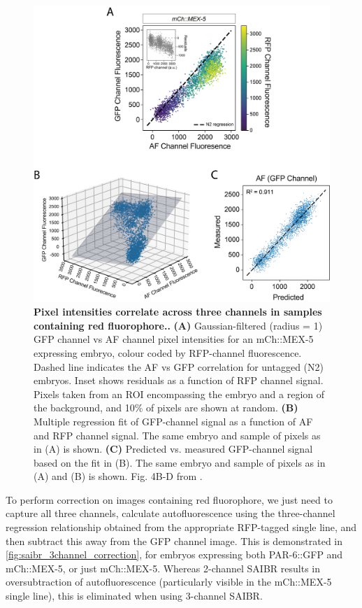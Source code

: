 \documentclass[12pt]{"article"}
\newcommand{\mycaption}[2]{\caption[#1]{\textbf{#1.} #2}}
\begin{document}
\begin{figure}
\includegraphics[scale=1]{saibr_3channel_correlation}
\centering
\mycaption{Pixel intensities correlate across three channels in samples containing red fluorophore.}{
\textbf{(A)} Gaussian-filtered (radius = 1) GFP channel vs AF channel pixel intensities for an mCh::MEX-5 expressing embryo, colour coded by RFP-channel fluorescence. Dashed line indicates the AF vs GFP correlation for untagged (N2) embryos. Inset shows residuals as a function of RFP channel signal. Pixels taken from an ROI encompassing the embryo and a region of the background, and 10\% of pixels are shown at random.
\textbf{(B)} Multiple regression fit of GFP-channel signal as a function of AF and RFP channel signal. The same embryo and sample of pixels as in (A) is shown.
\textbf{(C)} Predicted vs. measured GFP-channel signal based on the fit in (B). The same embryo and sample of pixels as in (A) and (B) is shown.
Fig. 4B-D from \textcite{Rodrigues2022}.
}
\label{fig:saibr_3channel_correlation}
\end{figure}

To perform correction on images containing red fluorophore, we just need to capture all three channels, calculate autofluorescence using the three-channel regression relationship obtained from the appropriate RFP-tagged single line, and then subtract this away from the GFP channel image. This is demonstrated in \cref{fig:saibr_3channel_correction}, for embryos expressing both PAR-6::GFP and mCh::MEX-5, or just mCh::MEX-5. Whereas 2-channel SAIBR results in oversubtraction of autofluorescence (particularly visible in the mCh::MEX-5 single line), this is eliminated when using 3-channel SAIBR.\\
\end{document}
